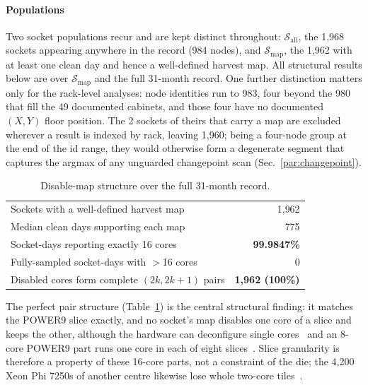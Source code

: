 \documentclass[10pt,conference]{IEEEtran}
\begin{document}
\paragraph*{Populations}\label{sec:pops} Two socket populations recur and are kept distinct throughout:
$\mathcal{S}_{\text{all}}$, the 1{,}968 sockets appearing anywhere in the record (984 nodes), and
$\mathcal{S}_{\text{map}}$, the 1{,}962 with at least one clean day and hence a well-defined
harvest map. All structural results below are over $\mathcal{S}_{\text{map}}$ and the full 31-month record.
One further distinction matters only for the rack-level analyses: node identities run to 983,
four beyond the 980 that fill the 49 documented cabinets, and those four have no documented
$(X,Y)$ floor position. The 2 sockets of theirs that carry a map are excluded wherever a result
is indexed by rack, leaving 1{,}960; being a four-node group at the end of the id range, they
would otherwise form a degenerate segment that captures the argmax of any unguarded changepoint
scan (Sec.~\ref{par:changepoint}).

\begin{table}[h]\centering\caption{Disable-map structure over the full 31-month record.}
\label{tab:struct}
\begin{tabular}{lr}\toprule
Sockets with a well-defined harvest map & 1{,}962\\
Median clean days supporting each map & 775\\
Socket-days reporting exactly 16 cores & \textbf{99.9847\%}\\
Fully-sampled socket-days with $>$16 cores & 0\\
Disabled cores form complete $(2k,2k{+}1)$ pairs & \textbf{1{,}962 (100\%)}\\
\bottomrule\end{tabular}\end{table}

The perfect pair structure (Table~\ref{tab:struct}) is the central structural finding: it matches the POWER9 slice
exactly, and no socket's map disables one core of a slice and keeps the other, although the
hardware can deconfigure single cores~\cite[p.~311]{ibm_p9um} and an 8-core POWER9 part runs one
core in each of eight slices~\cite{smith2020p9layout}. Slice granularity is therefore a property of
these 16-core parts, not a constraint of the die; the 4{,}200 Xeon Phi 7250s of another centre
likewise lose whole two-core tiles~\cite{mccalpin2021knl}.
\end{document}
